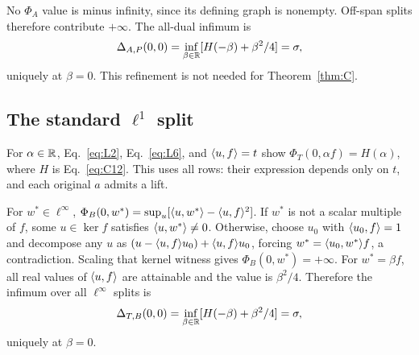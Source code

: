 No $\Phi_A$ value is minus infinity, since its defining graph is nonempty.
Off-span splits therefore contribute $+\infty$. The all-dual infimum is
\[
\Delta_{A,P}(0,0)=\inf_{\beta\in\mathbb R}[H(-\beta)+\beta^2/4]=\sigma,
\]
uniquely at $\beta=0$. This refinement is not needed for
Theorem~\ref{thm:C}.

\subsection{The standard $\ell^1$ split}
\label{sec:L6}
For $\alpha\in\mathbb R$, Eq.~\eqref{eq:L2}, Eq.~\eqref{eq:L6}, and
$\langle u,f\rangle=t$ show $\Phi_T(0,\alpha f)=H(\alpha)$, where $H$ is
Eq.~\eqref{eq:C12}. This uses all rows: their expression depends only on
$t$, and each original $a$ admits a lift.

For $w^*\in\ell^\infty$,
$\Phi_B(0,w^*)=\sup_u[\langle u,w^*\rangle-\langle u,f\rangle^2]$.
If $w^*$ is not a scalar multiple of $f$, some $u\in\ker f$ satisfies
$\langle u,w^*\rangle\ne0$. Otherwise, choose $u_0$ with $\langle u_0,f\rangle=1$ and
decompose any $u$ as $(u-\langle u,f\rangle u_0)+\langle u,f\rangle u_0$, forcing
$w^*=\langle u_0,w^*\rangle f$, a contradiction.
Scaling that kernel witness gives $\Phi_B(0,w^*)=+\infty$.
For $w^*=\beta f$, all real values of $\langle u,f\rangle$ are attainable and
the value is $\beta^2/4$. Therefore the infimum over all $\ell^\infty$
splits is
\[
\Delta_{T,B}(0,0)=\inf_{\beta\in\mathbb R}[H(-\beta)+\beta^2/4]=\sigma,
\]
uniquely at $\beta=0$.



